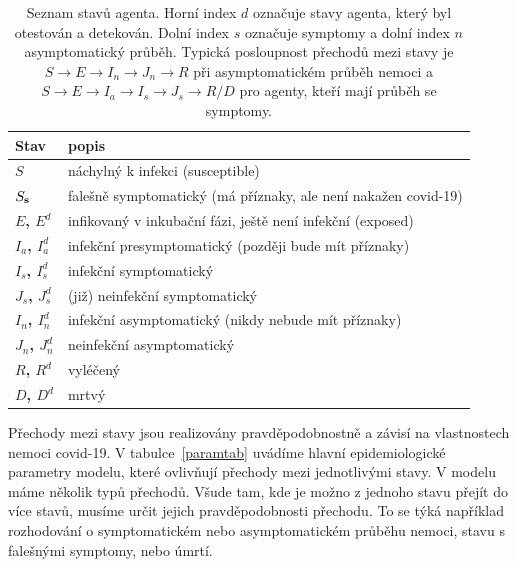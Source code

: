 \begin{table}
\centering
  \begin{tabular}{lp{}}
    \hline
		Stav & popis \\\hline
    {\bf $S$} & náchylný k infekci (susceptible)\\
    {\bf $S_{\bf s}$} & falešně symptomatický (má příznaky, ale není nakažen covid-19)\\ 
    {\bf $E$, $E^d$} & infikovaný v inkubační fázi, ještě není infekční (exposed) \\
    {\bf $I_{a}$, $I^d_{a}$} & infekční presymptomatický (později bude mít příznaky) \\
    {\bf $I_{s}$, $I^d_{s}$} & infekční symptomatický \\ 
    {\bf $J_{s}$, $J^d_{s}$} & (již) neinfekční symptomatický \\ 
    {\bf $I_{n}$, $I^d_{n}$} & infekční asymptomatický (nikdy nebude mít příznaky) \\ 
    {\bf $J_{ n}$, $J^d_{n}$} & neinfekční asymptomatický \\ 
    {\bf $R$, $R^{d}$} & vyléčený \\
    {\bf $D$, $D^{d}$} & mrtvý  \\
    \hline
  \end{tabular}
  \caption{Seznam stavů agenta. Horní index $d$ označuje stavy agenta, který byl otestován a detekován. Dolní index $s$ označuje symptomy a dolní index $n$ asymptomatický průběh. Typická posloupnost přechodů mezi stavy je $ S \rightarrow  E \rightarrow I_n \rightarrow J_n \rightarrow R$ při asymptomatickém průběh nemoci a $S \rightarrow E \rightarrow I_a \rightarrow I_s \rightarrow J_s \rightarrow R/D$ pro agenty, kteří mají průběh se symptomy.}
  \label{tab:states}
\end{table} 

Přechody mezi stavy jsou realizovány pravděpodobnostně a závisí na vlastnostech nemoci covid-19. V tabulce~\ref{paramtab} uvádíme hlavní epidemiologické parametry modelu, které ovlivňují přechody mezi jednotlivými stavy. V modelu máme několik typů přechodů. Všude tam, kde je možno z jednoho stavu přejít do více stavů, musíme určit jejich pravděpodobnosti přechodu. To se týká například rozhodování o symptomatickém nebo asymptomatickém průběhu nemoci, stavu s falešnými symptomy, nebo úmrtí. 

